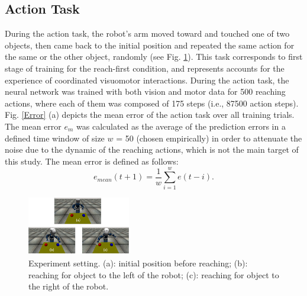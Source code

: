 \documentclass[conference]{IEEEtran}
\begin{document}
\subsection{Action Task}
During the action task, the robot's arm moved toward and touched one of two objects, then came back to the initial position and repeated the same action for the same or the other object, randomly (see Fig. \ref{iCub}). This task corresponds to first stage of training for the reach-first condition, and represents accounts for the experience of coordinated visuomotor interactions. During the action task, the neural network was trained with both vision and motor data for 500 reaching actions, where each of them was composed of 175 steps (i.e., 87500 action steps). Fig. \ref{Error} (a) depicts the mean error of the action task over all training trials. The mean error \(\textit{e}_{m}\) was calculated as the average of the prediction errors in a defined time window of size $w$ = 50 (chosen empirically) in order to attenuate the noise due to the dynamic of the reaching actions, which is not the main target of this study. The mean error is defined as follows: 
\begin{equation}
	\textit{e}_{mean}(t+1) = \frac{1}{w}\sum\limits_{i=1}^{w} \textit{e}(t - i).
\end{equation}

\begin{figure}
\centering
\includegraphics[width=0.40\textwidth,natwidth=700,natheight=450]{Simulator_light.png}
\caption{Experiment setting. (a): initial position before reaching; (b): reaching for object to the left of the robot; (c): reaching for object to the right of the robot.}
\label{iCub} 
\end{figure}
\end{document}
